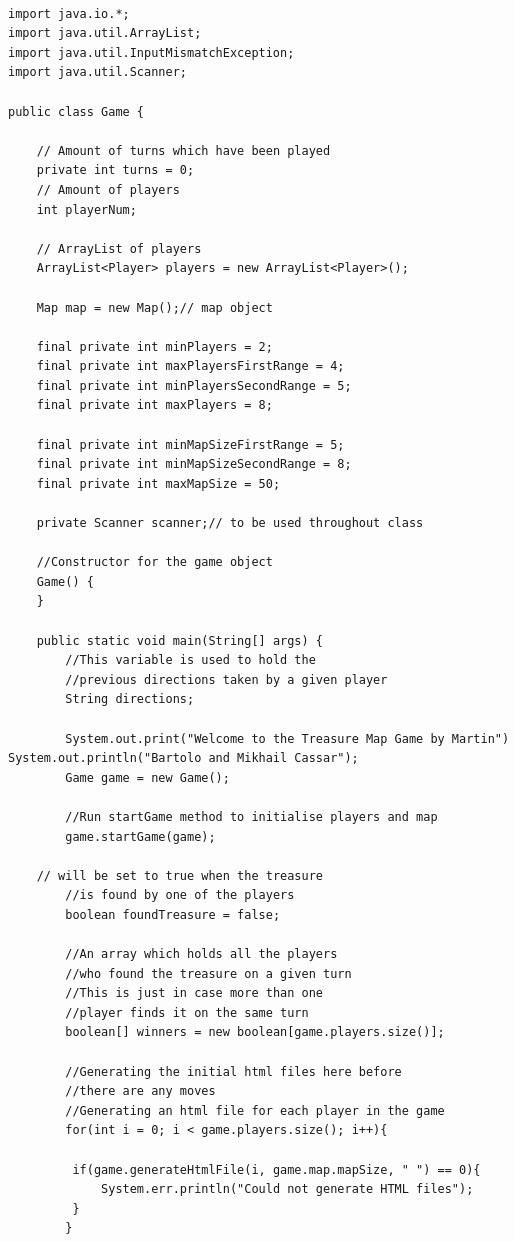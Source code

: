 \documentclass[a4paper,12pt]{extarticle}
\begin{document}
\begin{lstlisting}[caption=The initial code of the Game class, label=amb]

import java.io.*;
import java.util.ArrayList;
import java.util.InputMismatchException;
import java.util.Scanner;

public class Game {

    // Amount of turns which have been played
    private int turns = 0;
    // Amount of players
    int playerNum;
	
	// ArrayList of players
    ArrayList<Player> players = new ArrayList<Player>();

    Map map = new Map();// map object

    final private int minPlayers = 2;
    final private int maxPlayersFirstRange = 4;
    final private int minPlayersSecondRange = 5;
    final private int maxPlayers = 8;

    final private int minMapSizeFirstRange = 5;
    final private int minMapSizeSecondRange = 8;
    final private int maxMapSize = 50;

    private Scanner scanner;// to be used throughout class

    //Constructor for the game object
    Game() {
    }

    public static void main(String[] args) {
        //This variable is used to hold the 
        //previous directions taken by a given player
        String directions;

        System.out.print("Welcome to the Treasure Map Game by Martin") 		System.out.println("Bartolo and Mikhail Cassar");
        Game game = new Game();

        //Run startGame method to initialise players and map
        game.startGame(game);
        
	// will be set to true when the treasure
        //is found by one of the players
        boolean foundTreasure = false;
        
        //An array which holds all the players 
        //who found the treasure on a given turn
        //This is just in case more than one 
        //player finds it on the same turn
        boolean[] winners = new boolean[game.players.size()];

        //Generating the initial html files here before 
        //there are any moves
        //Generating an html file for each player in the game
        for(int i = 0; i < game.players.size(); i++){

         if(game.generateHtmlFile(i, game.map.mapSize, " ") == 0){
             System.err.println("Could not generate HTML files");
         }
        }


\end{lstlisting}
\end{document}
